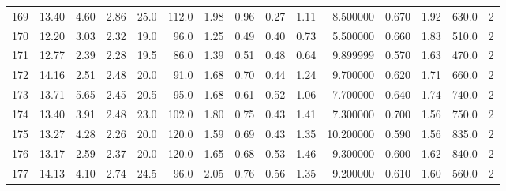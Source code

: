 \documentclass{article}
\begin{document}
\begin{tabular}{lrrrrrrrrrrrrrr}
    169 &    13.40 &        4.60 &  2.86 &               25.0 &      112.0 &           1.98 &        0.96 &                  0.27 &             1.11 &         8.500000 &  0.670 &                          1.92 &    630.0 &      2 \\
    170 &    12.20 &        3.03 &  2.32 &               19.0 &       96.0 &           1.25 &        0.49 &                  0.40 &             0.73 &         5.500000 &  0.660 &                          1.83 &    510.0 &      2 \\
    171 &    12.77 &        2.39 &  2.28 &               19.5 &       86.0 &           1.39 &        0.51 &                  0.48 &             0.64 &         9.899999 &  0.570 &                          1.63 &    470.0 &      2 \\
    172 &    14.16 &        2.51 &  2.48 &               20.0 &       91.0 &           1.68 &        0.70 &                  0.44 &             1.24 &         9.700000 &  0.620 &                          1.71 &    660.0 &      2 \\
    173 &    13.71 &        5.65 &  2.45 &               20.5 &       95.0 &           1.68 &        0.61 &                  0.52 &             1.06 &         7.700000 &  0.640 &                          1.74 &    740.0 &      2 \\
    174 &    13.40 &        3.91 &  2.48 &               23.0 &      102.0 &           1.80 &        0.75 &                  0.43 &             1.41 &         7.300000 &  0.700 &                          1.56 &    750.0 &      2 \\
    175 &    13.27 &        4.28 &  2.26 &               20.0 &      120.0 &           1.59 &        0.69 &                  0.43 &             1.35 &        10.200000 &  0.590 &                          1.56 &    835.0 &      2 \\
    176 &    13.17 &        2.59 &  2.37 &               20.0 &      120.0 &           1.65 &        0.68 &                  0.53 &             1.46 &         9.300000 &  0.600 &                          1.62 &    840.0 &      2 \\
    177 &    14.13 &        4.10 &  2.74 &               24.5 &       96.0 &           2.05 &        0.76 &                  0.56 &             1.35 &         9.200000 &  0.610 &                          1.60 &    560.0 &      2 \\
    \bottomrule
    \end{tabular}    
\end{document}
